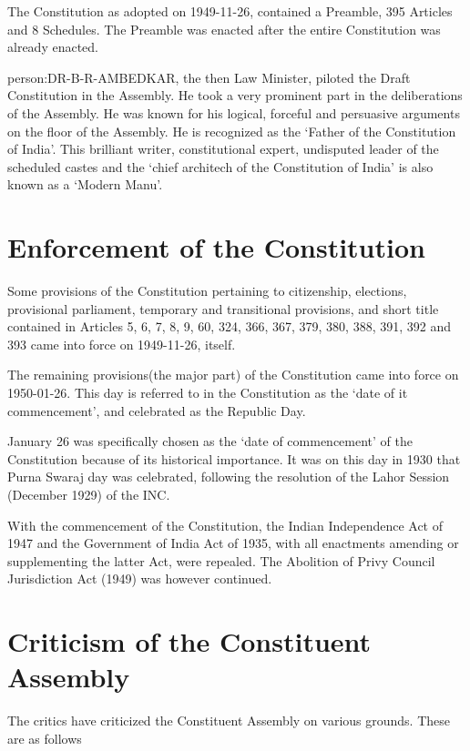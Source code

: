 { The Constitution as adopted on 1949-11-26, contained a Preamble, 395 Articles and 8 Schedules}. The Preamble was enacted after the entire Constitution was already enacted.

\gls{person:DR-B-R-AMBEDKAR}, the then Law Minister, piloted the Draft Constitution in the Assembly. He took a very prominent part in the deliberations of the Assembly. He was known for his logical, forceful and persuasive arguments on the floor of the Assembly. He is recognized as the `Father of the Constitution of India'. This brilliant writer, constitutional expert, undisputed leader of the scheduled castes and the `chief architech of the Constitution of India' is also known as a `Modern Manu'.

\section{Enforcement of the Constitution}

Some provisions of the Constitution pertaining to citizenship, elections, provisional parliament, temporary and transitional provisions, and short title contained in Articles 5, 6, 7, 8, 9, 60, 324, 366, 367, 379, 380, 388, 391, 392 and 393 came into force on 1949-11-26, itself.

The remaining provisions(the major part) of the Constitution came into force on 1950-01-26. This day is referred to in the Constitution as the `date of it commencement', and celebrated as the Republic Day.

January 26 was specifically chosen as the `date of commencement' of the Constitution because of its historical importance. It was on this day in 1930 that { Purna Swaraj} day was celebrated, following the resolution of the Lahor Session (December 1929) of the INC.

With the commencement of the Constitution, the Indian Independence Act of 1947 and the Government of India Act of 1935, with all enactments amending or supplementing the latter Act, were repealed. The Abolition of Privy Council Jurisdiction Act (1949) was however continued.

\section{Criticism of the Constituent Assembly}

The critics have criticized the Constituent Assembly on various grounds. These are as follows

